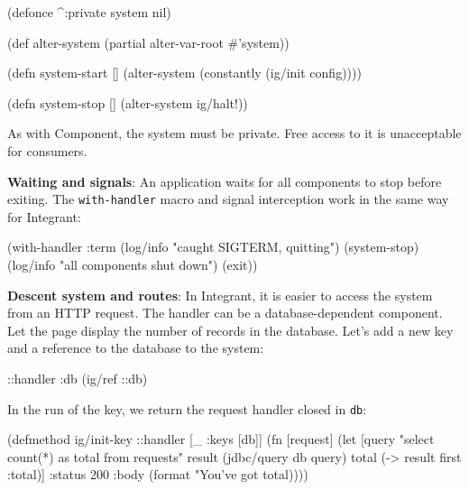 \else

\begin{english}
  \begin{clojure}
(defonce ^:private system nil)

(def alter-system (partial alter-var-root #'system))

(defn system-start []
  (alter-system (constantly (ig/init config))))

(defn system-stop []
  (alter-system ig/halt!))
  \end{clojure}
\end{english}

\fi

As with Component, the system must be private. Free access to it is unacceptable for consumers.


\textbf{Waiting and signals}: An application waits for all components to stop before exiting. The \verb|with-handler| macro and signal interception work in the same way for Integrant:

\begin{english}
  \begin{clojure}
(with-handler :term
  (log/info "caught SIGTERM, quitting")
  (system-stop)
  (log/info "all components shut down")
  (exit))
  \end{clojure}
\end{english}


\textbf{Descent system and routes}: In Integrant, it is easier to access the system from an HTTP request. The handler can be a database-dependent component. Let the page display the number of records in the database. Let's add a new key and a reference to the database to the system:

\begin{english}
  \begin{clojure}
{::handler {:db (ig/ref ::db)}}
  \end{clojure}
\end{english}

\noindent
In the run of the key, we return the request handler closed in \verb|db|:

\ifnarrow

\begin{english}
  \begin{clojure}
(defmethod ig/init-key ::handler
  [_ {:keys [db]}]
  (fn [request]
    (let [query "select count(*) as total
                 from requests"
          result (jdbc/query db query)
          total (-> result first :total)]
      {:status 200
       :body (format
               "You've got %
               total)})))
  \end{clojure}
\end{english}

